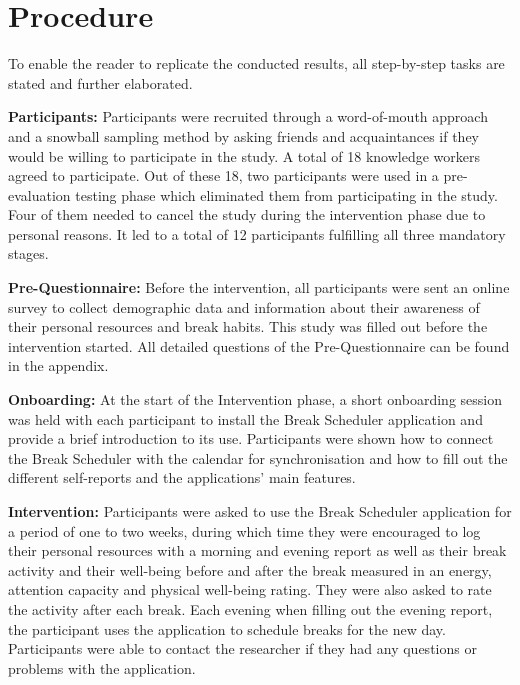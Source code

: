 \documentclass{hasel_thesis}
\begin{document}
\section{Procedure}
\begin{comment} 
- Step-by-step description of the procedure followed in conducting the study, including data collection, administration of the recharge breaks, and any other relevant details
\end{comment}
To enable the reader to replicate the conducted results, all step-by-step tasks are stated and further elaborated.

\textbf{Participants:} Participants were recruited through a word-of-mouth approach and a snowball sampling method by asking friends and acquaintances if they would be willing to participate in the study. A total of 18 knowledge workers agreed to participate. Out of these 18, two participants were used in a pre-evaluation testing phase which eliminated them from participating in the study. Four of them needed to cancel the study during the intervention phase due to personal reasons. It led to a total of 12 participants fulfilling all three mandatory stages.

\textbf{Pre-Questionnaire:} Before the intervention, all participants were sent an online survey to collect demographic data and information about their awareness of their personal resources and break habits. This study was filled out before the intervention started. All detailed questions of the Pre-Questionnaire can be found in the appendix.

\textbf{Onboarding:} At the start of the Intervention phase, a short onboarding session was held with each participant to install the Break Scheduler application and provide a brief introduction to its use. Participants were shown how to connect the Break Scheduler with the calendar for synchronisation and how to fill out the different self-reports and the applications' main features.

\textbf{Intervention:} Participants were asked to use the Break Scheduler application for a period of one to two weeks, during which time they were encouraged to log their personal resources with a morning and evening report as well as their break activity and their well-being before and after the break measured in an energy, attention capacity and physical well-being rating. They were also asked to rate the activity after each break. Each evening when filling out the evening report, the participant uses the application to schedule breaks for the new day. Participants were able to contact the researcher if they had any questions or problems with the application.
\end{document}
